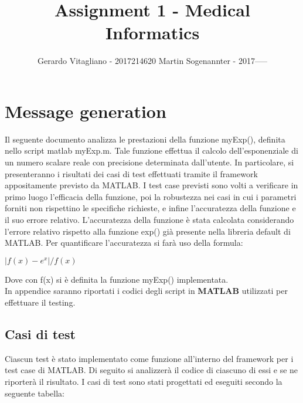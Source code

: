\documentclass[a4paper,titlepage]{article}
\newcommand{\subtitle}[1]{%
  \posttitle{%
    \par\end{center}
    \begin{center}\large#1\end{center}
    \vskip0.5em}%
}
\begin{document}
\title{Assignment 1 - Medical Informatics}
\subtitle{Clinical message parsing}
\author{Gerardo Vitagliano - 2017214620
		Martin Sogenannter - 2017-----}
\date{\vspace{-5ex}}
\vfill
\maketitle
\clearpage
\section{Message generation}

          Il seguente documento analizza le prestazioni della funzione myExp(), definita nello script matlab myExp.m. Tale funzione effettua il calcolo
		  dell'esponenziale di un numero scalare reale con precisione determinata dall'utente.
		  In particolare, si presenteranno i risultati dei casi di test effettuati tramite il framework appositamente previsto da MATLAB.
		  I test case previsti sono volti a verificare in primo luogo l'efficacia della funzione, poi la robustezza nei casi in cui i parametri forniti
		  non rispettino le specifiche richieste, e infine l'accuratezza della funzione e il suo errore relativo.
		  		 L'accuratezza della funzione è stata calcolata considerando l'errore relativo rispetto alla funzione exp() già presente nella libreria default di MATLAB.
		 Per quantificare l'accuratezza si farà uso della formula:\\
			\centerline{$|f(x)-e^x|/f(x)$}
		 Dove con f(x) si è definita la funzione myExp() implementata.\\
		In appendice saranno riportati i codici degli script in \textbf{MATLAB} utilizzati per effettuare il testing.
		 
		\subsection{Casi di test}
		Ciascun test è stato implementato come funzione all'interno del framework per i test case di MATLAB. 
		Di seguito si analizzerà il codice di ciascuno di essi e se ne riporterà il risultato.
		I casi di test sono stati progettati ed eseguiti secondo la seguente tabella:
\end{document}
